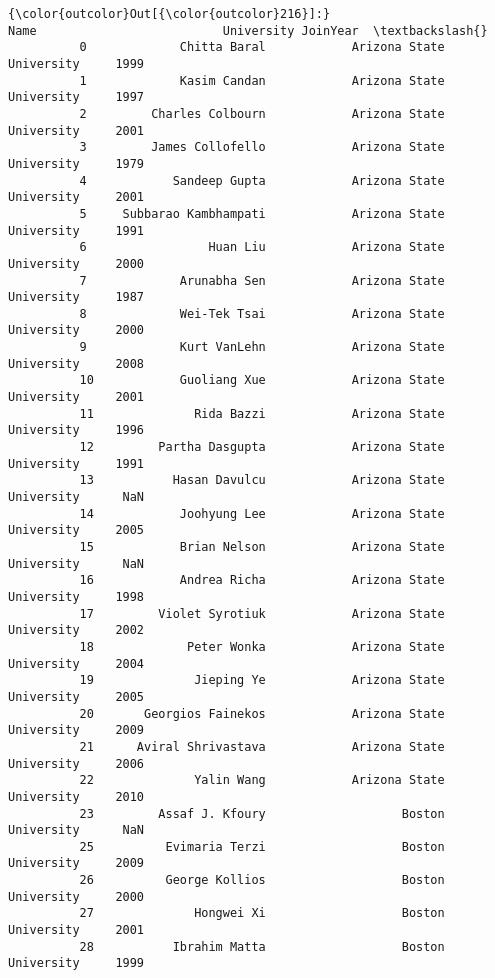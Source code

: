 \documentclass[11pt]{article}
\begin{document}
            \begin{Verbatim}[commandchars=\\\{\}]
{\color{outcolor}Out[{\color{outcolor}216}]:}                       Name                          University JoinYear  \textbackslash{}
          0             Chitta Baral            Arizona State University     1999   
          1             Kasim Candan            Arizona State University     1997   
          2         Charles Colbourn            Arizona State University     2001   
          3         James Collofello            Arizona State University     1979   
          4            Sandeep Gupta            Arizona State University     2001   
          5     Subbarao Kambhampati            Arizona State University     1991   
          6                 Huan Liu            Arizona State University     2000   
          7             Arunabha Sen            Arizona State University     1987   
          8             Wei-Tek Tsai            Arizona State University     2000   
          9             Kurt VanLehn            Arizona State University     2008   
          10            Guoliang Xue            Arizona State University     2001   
          11              Rida Bazzi            Arizona State University     1996   
          12         Partha Dasgupta            Arizona State University     1991   
          13           Hasan Davulcu            Arizona State University      NaN   
          14            Joohyung Lee            Arizona State University     2005   
          15            Brian Nelson            Arizona State University      NaN   
          16            Andrea Richa            Arizona State University     1998   
          17         Violet Syrotiuk            Arizona State University     2002   
          18             Peter Wonka            Arizona State University     2004   
          19              Jieping Ye            Arizona State University     2005   
          20       Georgios Fainekos            Arizona State University     2009   
          21      Aviral Shrivastava            Arizona State University     2006   
          22              Yalin Wang            Arizona State University     2010   
          23         Assaf J. Kfoury                   Boston University      NaN   
          25          Evimaria Terzi                   Boston University     2009   
          26          George Kollios                   Boston University     2000   
          27              Hongwei Xi                   Boston University     2001   
          28           Ibrahim Matta                   Boston University     1999   

\end{Verbatim}
\end{document}
